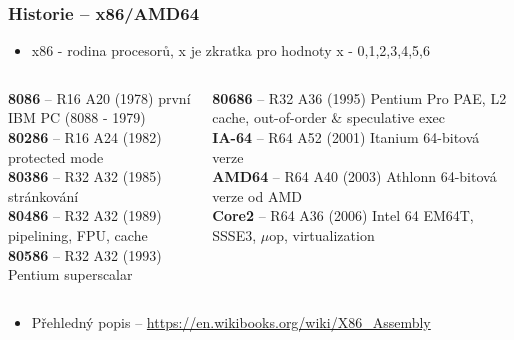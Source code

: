 \documentclass{beamer}
\begin{document}
\begin{frame}
\frametitle{Historie -- x86/AMD64}
\begin{itemize}
\item x86 - rodina procesorů, x je zkratka pro hodnoty x - 0,1,2,3,4,5,6
\end{itemize}

\begin{columns}[t,onlytextwidth]
\begin{column}{0.48\textwidth}
\textbf{8086} -- R16 A20 (1978) první IBM PC (8088 - 1979) \\
\textbf{80286} -- R16 A24 (1982) protected mode\\
\textbf{80386} -- R32 A32 (1985) stránkování\\
\textbf{80486} -- R32 A32 (1989) pipelining, FPU, cache\\
\textbf{80586} -- R32 A32 (1993) Pentium superscalar\\
\end{column}
\begin{column}{0.48\textwidth}  
\textbf{80686} -- R32 A36 (1995) Pentium Pro PAE, L2 cache, out-of-order \& speculative exec\\
\textbf{IA-64} -- R64 A52 (2001) Itanium 64-bitová verze\\
\textbf{AMD64} -- R64 A40 (2003) Athlonn 64-bitová verze od AMD\\
\textbf{Core2} -- R64 A36 (2006) Intel 64 EM64T, SSSE3, $\mu$op, virtualization
\end{column}
\end{columns}

\begin{itemize}
\item Přehledný popis -- \url{https://en.wikibooks.org/wiki/X86\_Assembly}
\end{itemize}

\end{frame}
\end{document}
